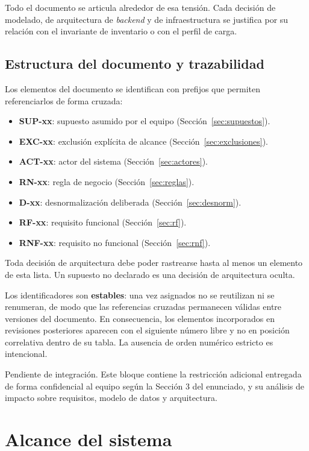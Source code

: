 \documentclass[10pt,letterpaper]{article}
\newcommand{\restriccion}[1]{%
  \begin{tcolorbox}[colback=yellow!12,colframe=orange!70!black,
    title=\textbf{Restricción específica del equipo (Sección 3)},sharp corners=south]
  #1
  \end{tcolorbox}}
\begin{document}
Todo el documento se articula alrededor de esa tensión. Cada decisión de modelado, de arquitectura de \emph{backend} y de infraestructura se justifica por su relación con el invariante de inventario o con el perfil de carga.

\subsection{Estructura del documento y trazabilidad}
Los elementos del documento se identifican con prefijos que permiten referenciarlos de forma cruzada:
\begin{itemize}
  \item \textbf{SUP-xx}: supuesto asumido por el equipo (Sección~\ref{sec:supuestos}).
  \item \textbf{EXC-xx}: exclusión explícita de alcance (Sección~\ref{sec:exclusiones}).
  \item \textbf{ACT-xx}: actor del sistema (Sección~\ref{sec:actores}).
  \item \textbf{RN-xx}: regla de negocio (Sección~\ref{sec:reglas}).
  \item \textbf{D-xx}: desnormalización deliberada (Sección~\ref{sec:desnorm}).
  \item \textbf{RF-xx}: requisito funcional (Sección~\ref{sec:rf}).
  \item \textbf{RNF-xx}: requisito no funcional (Sección~\ref{sec:rnf}).
\end{itemize}

Toda decisión de arquitectura debe poder rastrearse hasta al menos un elemento de esta lista. Un supuesto no declarado es una decisión de arquitectura oculta.

Los identificadores son \textbf{estables}: una vez asignados no se reutilizan ni se renumeran, de modo que las referencias cruzadas permanecen válidas entre versiones del documento. En consecuencia, los elementos incorporados en revisiones posteriores aparecen con el siguiente número libre y no en posición correlativa dentro de su tabla. La ausencia de orden numérico estricto es intencional.

\restriccion{Pendiente de integración. Este bloque contiene la restricción adicional entregada de forma confidencial al equipo según la Sección 3 del enunciado, y su análisis de impacto sobre requisitos, modelo de datos y arquitectura.}

\section{Alcance del sistema}
\end{document}
